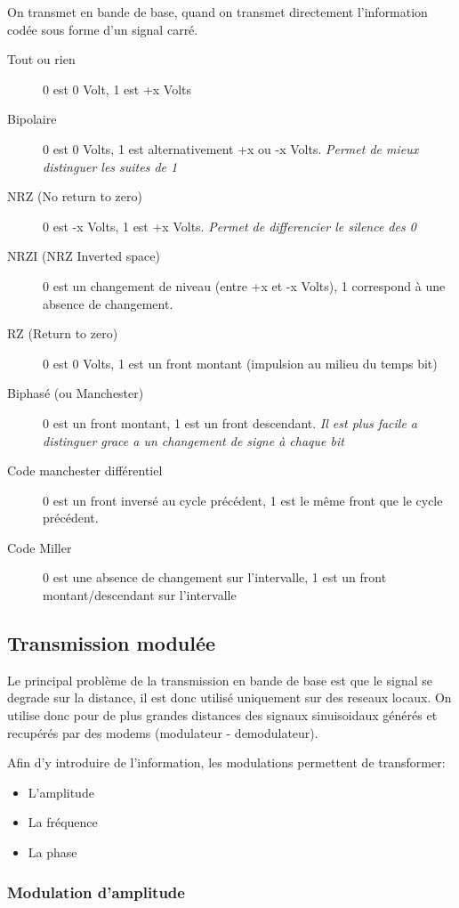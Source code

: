 \documentclass[a4paper, 12pt, french]{article}
\begin{document}
	On transmet en bande de base, quand on transmet directement l'information codée sous forme d'un signal carré.

	\begin{description}
		\item[Tout ou rien] 0 est 0 Volt, 1 est +x Volts
		\item[Bipolaire] 0 est 0 Volts, 1 est alternativement +x ou -x Volts. \emph{Permet de mieux distinguer les suites de 1}
		\item[NRZ (No return to zero)] 0 est -x Volts, 1 est +x Volts. \emph{Permet de differencier le silence des 0}
		\item[NRZI (NRZ Inverted space)] 0 est un changement de niveau (entre +x et -x Volts), 1 correspond à une absence de changement.
		\item[RZ (Return to zero)] 0 est 0 Volts, 1 est un front montant (impulsion au milieu du temps bit)
		\item[Biphasé (ou Manchester)] 0 est un front montant, 1 est un front descendant. \emph{Il est plus facile a distinguer grace a un changement de signe à chaque bit}
		\item[Code manchester différentiel] 0 est un front inversé au cycle précédent, 1 est le même front que le cycle précédent.
		\item[Code Miller] 0 est une absence de changement sur l'intervalle, 1 est un front montant/descendant sur l'intervalle
 	\end{description}

	\subsection{Transmission modulée}

	Le principal problème de la transmission en bande de base est que le signal se degrade sur la distance, il est donc utilisé uniquement sur des reseaux locaux. On utilise donc pour de plus grandes distances des signaux sinuisoidaux générés et recupérés par des modems (modulateur - demodulateur).

	Afin d'y introduire de l'information, les modulations permettent de transformer:
	\begin{itemize}
		\item L'amplitude
		\item La fréquence
		\item La phase
	\end{itemize}

	\subsubsection{Modulation d'amplitude}
\end{document}
